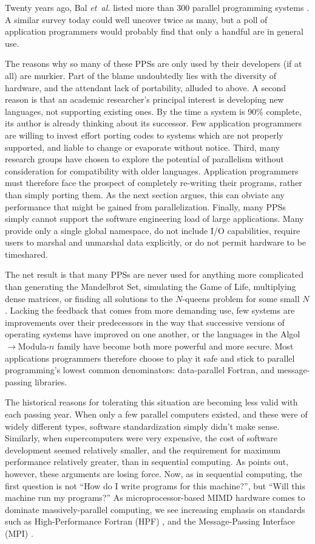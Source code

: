 Twenty years ago,
Bal {\em{et~al.}\/} listed more than 300 parallel programming systems \cite{b:par-lang-survey}.
A similar survey today could well uncover twice as many,
but a poll of application programmers would probably find that
only a handful are in general use.

The reasons why so many of these PPSs are only used by their developers (if at all) are murkier.
Part of the blame undoubtedly lies with the diversity of hardware,
and the attendant lack of portability,
alluded to above.
A second reason is that an academic researcher's principal interest is developing new languages,
not supporting existing ones.
By the time a system is 90\% complete,
its author is already thinking about its successor.
Few application programmers are willing to invest effort porting codes
to systems which are not properly supported,
and liable to change or evaporate without notice.
Third,
many research groups have chosen to explore the potential of parallelism
without consideration for compatibility with older languages.
Application programmers must therefore face the prospect of completely re-writing their programs,
rather than simply porting them.
As the next section argues,
this can obviate any performance that might be gained from parallelization.
Finally,
many PPSs simply cannot support the software engineering load of large applications.
Many provide only a single global namespace,
do not include I/O capabilities,
require users to marshal and unmarshal data explicitly,
or do not permit hardware to be timeshared.

The net result is that many PPSs are never used for anything more complicated than
generating the Mandelbrot Set,
simulating the Game of Life,
multiplying dense matrices,
or finding all solutions to the $N$-queens problem for some small $N$.
Lacking the feedback that comes from more demanding use,
few systems are improvements over their predecessors
in the way that successive versions of operating systems have improved on one another,
or the languages in the Algol$\rightarrow$Modula-$n$ family
have become both more powerful and more secure.
Most applications programmers therefore choose to play it safe
and stick to parallel programming's lowest common denominators:
data-parallel Fortran,
and message-passing libraries.

The historical reasons for tolerating this situation are becoming less valid with each passing year.
When only a few parallel computers existed,
and these were of widely different types,
software standardization simply didn't make sense.
Similarly,
when supercomputers were very expensive,
the cost of software development seemed relatively smaller,
and the requirement for maximum performance relatively greater,
than in sequential computing.
As \cite{b:social-limits-speed} points out,
however, these arguments are losing force.
Now,
as in sequential computing,
the first question is not ``How do I write programs for this machine?'',
but ``Will this machine run my programs?''
As microprocessor-based MIMD hardware comes to dominate massively-parallel computing,
we see increasing emphasis on standards such as High-Performance Fortran (HPF) \cite{b:hpf-overview},
and the Message-Passing Interface (MPI) \cite{b:mpi-overview}.

